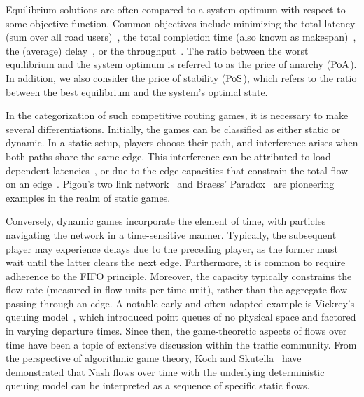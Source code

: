 Equilibrium solutions are often compared to a system optimum with respect to some objective function. %
Common objectives include minimizing the total latency (sum over all road users)~\cite{harks2018competitive}, the total completion time (also known as makespan)~\cite{WERTH201418}, the (average) delay~\cite{DBLP:journals/ior/ScarsiniST18}, 
or the throughput~\cite{kochskutella2011}. The ratio between the worst equilibrium and the system optimum is referred to as the price of anarchy ($\operatorname*{PoA}$). In addition, we also consider the price of stability ($\operatorname*{PoS}$), which refers to the ratio between the best equilibrium and the system's optimal state.  

In the categorization of such competitive routing games, it is necessary to make several differentiations. Initially, the games can be classified as either static or dynamic. In a static setup, players choose their path, and interference arises when both paths share the same edge. This interference can be attributed to load-dependent latencies~\cite{roughgarden2005selfish}, or due to the edge capacities that constrain the total flow on an edge~\cite{correa2004selfish}. Pigou's two link network~\cite{pigou} and Braess’ Paradox~\cite{braess1968paradoxon} are pioneering examples in the realm of static games.

Conversely, dynamic games incorporate the element of time, with particles navigating the network in a time-sensitive manner. Typically, the subsequent player may experience delays due to the preceding player, as the former must wait until the latter clears the next edge. Furthermore, it is common to require adherence to the FIFO principle. Moreover, the capacity typically constrains the flow rate (measured in flow units per time unit), rather than the aggregate flow passing through an edge. A notable early and often adapted example is Vickrey’s queuing model~\cite{vickrey1969congestion}, which introduced point queues of no physical space and factored in varying departure times. 
Since then, the game-theoretic aspects of flows over time have been a topic of extensive discussion within the traffic community. From the perspective of algorithmic game theory, Koch and Skutella~\cite{kochskutella2011} have demonstrated that Nash flows over time with the underlying deterministic queuing model can be interpreted as a sequence of specific static flows. %


